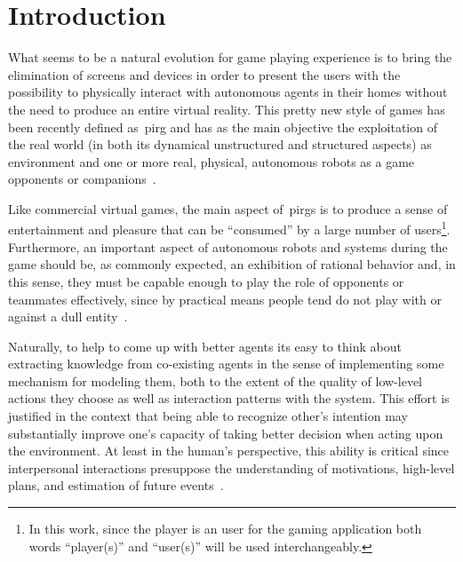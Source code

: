 \chapter{Introduction}
What seems to be a natural evolution for game playing experience is to bring the elimination of screens and devices in order to present the users with the possibility to physically interact with autonomous agents in their homes without the need to produce an entire virtual reality. This pretty new style of games has been recently defined as~\gls{pirg} and has as the main objective the exploitation of the real world (in both its dynamical unstructured and structured aspects) as environment and one or more real, physical, autonomous robots as a game opponents or companions~\cite{martinoia_physically_2013}.

Like commercial virtual games, the main aspect of~\gls{pirg}s is to produce a sense of entertainment and pleasure that can be ``consumed'' by a large number of users\footnote{In this work, since the player is an user for the gaming application both words ``player(s)'' and ``user(s)'' will be used interchangeably.}. Furthermore, an important aspect of autonomous robots and systems during the game should be, as commonly expected, an exhibition of rational behavior and, in this sense, they must be capable enough to play the role of opponents or teammates effectively, since by practical means people tend do not play with or against a dull entity~\cite{martinoia_physically_2013}.

Naturally, to help to come up with better agents its easy to think about extracting knowledge from co-existing agents in the sense of implementing some mechanism for modeling them, both to the extent of the quality of low-level actions they choose as well as interaction patterns with the system. This effort is justified in the context that being able to recognize other's intention may substantially improve one's capacity of taking better decision when acting upon the environment.  At least in the human's perspective, this ability is critical since interpersonal interactions presuppose the understanding of motivations, high-level plans, and estimation of future events~\cite{sukthankar_plan_2014}.

